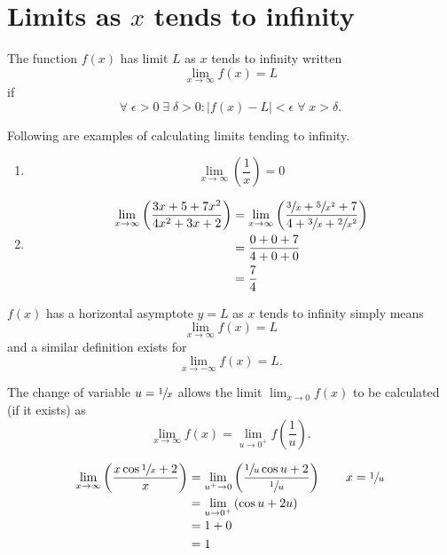 \section{Limits as $x$ tends to infinity}

\begin{definition}
    The function $f(x)$ has limit $L$ as $x$ tends to infinity written \[\lim_{x\to\infty}f(x)=L\] if \[\forall\;\epsilon>0\;\exists\;\delta>0:|f(x)-L|<\epsilon\;\forall\;x>\delta.\]
\end{definition}

\begin{example}
    Following are examples of calculating limits tending to infinity.
    \begin{enumerate}
        \item \[\lim_{x\to\infty}\left(\dfrac1x\right)=0\]
        
        \item 
        \begin{align*}
            \lim_{x\to\infty}\left(\dfrac{3x+5+7x^2}{4x^2+3x+2}\right)&=\lim_{x\to\infty}\left(\dfrac{\sfrac3x+\sfrac5{x^2}+7}{4+\sfrac3x+\sfrac2{x^2}}\right)\\
            &=\dfrac{0+0+7}{4+0+0}\\
            &=\dfrac74
        \end{align*}
    \end{enumerate}
\end{example}

\begin{remark}
    $f(x)$ has a horizontal asymptote $y=L$ as $x$ tends to infinity simply means \[\lim_{x\to\infty}f(x)=L\] and a similar definition exists for \[\lim_{x\to-\infty}f(x)=L.\]
\end{remark}

\begin{remark}
    The change of variable $u=\sfrac1x$ allows the limit $\lim_{x\to0}f(x)$ to be calculated (if it exists) as \[\lim_{x\to\infty}f(x)=\lim_{u\to0^+}f\left(\dfrac1u\right).\]
\end{remark}

\begin{example}
    \begin{align*}
        \lim_{x\to\infty}\left(\dfrac{x\cos{\sfrac1x}+2}{x}\right)&=\lim_{u^+\to0}\left(\dfrac{\sfrac1u\cos{u}+2}{\sfrac1u}\right)\qquad x=\sfrac1u\\
        &=\lim_{u\to0^+}\left(\cos u+2u\right)\\
        &=1+0\\
        &=1
    \end{align*}
\end{example}


